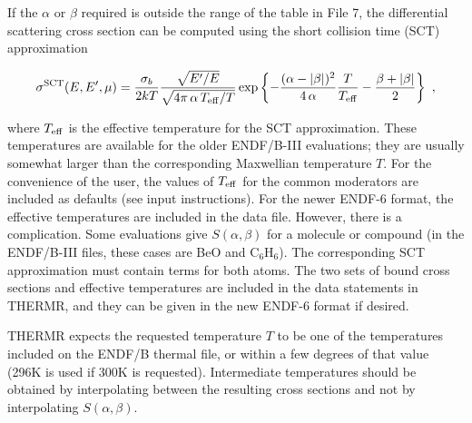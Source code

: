 If the $\alpha$ or $\beta$ required is outside the range of the table
in File 7, the differential scattering cross section can be computed
using the short collision time (SCT) approximation

\begin{equation}
   \sigma^{\rm SCT}(E,E',\mu)=\frac{\sigma_b}{2kT}
     \frac{\sqrt{E'/E}}{\sqrt{4\pi\,\alpha\,T_{\rm eff}/T}}
      \exp\left\{-\frac{(\alpha-|\beta|)^2}{4\,\alpha}
        \frac{T}{T_{\rm eff}}-\frac{\beta+|\beta|}{2}\right\}\,\,,
\end{equation}

\noindent
where $T_{\rm eff}$ is the effective temperature for the SCT approximation.
These temperatures are available\cite{GAreport} for the older
ENDF/B-III evaluations; they are usually somewhat larger
than the corresponding Maxwellian temperature $T$.  For the convenience
of the user, the values of $T_{\rm eff}$ for the common moderators are
included as defaults (see input instructions).  For the newer ENDF-6
format, the effective temperatures are included in the data file.
However, there is a complication.  Some evaluations give $S(\alpha,\beta)$ for
a molecule or compound (in the ENDF/B-III files, these cases are
BeO and C$_6$H$_6$).  The corresponding SCT approximation must contain
terms for both atoms.  The two sets of bound cross sections and effective
temperatures are included in the data statements in THERMR, and they
can be given in the new ENDF-6 format if desired.

THERMR expects the requested temperature $T$ to be one of the temperatures
included on the ENDF/B thermal file, or within a few degrees of that
value (296K is used if 300K is requested).  Intermediate temperatures
should be obtained by interpolating between the resulting cross sections
and not by interpolating $S(\alpha,\beta)$.

